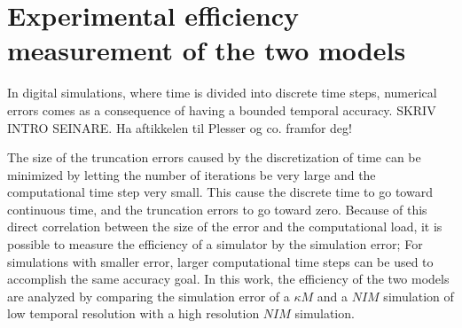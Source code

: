 \documentclass[b5paper,12 pt]{report}
\begin{document}

		
		



	
	\chapter{Experimental efficiency measurement of the two models}
	\label{chExperimentalEfficiencyMeasurement}
		In digital simulations, where time is divided into discrete time steps, numerical errors comes as a consequence of having a bounded temporal accuracy. %
		SKRIV INTRO SEINARE. Ha aftikkelen til Plesser og co. framfor deg! %




The size of the truncation errors caused by the discretization of time can be minimized by letting the number of iterations be very large and the computational time step very small.
This cause the discrete time to go toward continuous time, and the truncation errors to go toward zero. %
Because of this direct correlation between the size of the error and the computational load, it is possible to measure the efficiency of a simulator by the simulation error;
	For simulations with smaller error, larger computational time steps can be used to accomplish the same accuracy goal.
In this work, the efficiency of the two models are analyzed by comparing the simulation error of a $\kappa M$ and a $NIM$ simulation of low temporal resolution with a high resolution $NIM$ simulation. %
\end{document}
